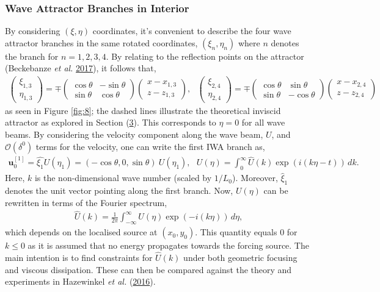 \documentclass[a4paper]{article}
\numberwithin{equation}{section}
\begin{document}
\subsubsection{Wave Attractor Branches in Interior}
\label{sec:4.3.1}
By considering $(\xi, \eta)$ coordinates, it's convenient to describe the four wave attractor branches in the same rotated coordinates, $(\xi_n, \eta_n)$ where $n$ denotes the branch for $n = 1,2,3,4$. By relating to the reflection points on the attractor (Beckebanze \emph{et al.} \hyperlink{ref 8}{2017}), it follows that, 
\begin{align*}
\begin{pmatrix}
\xi_{1,3}\\
\eta_{1,3}
\end{pmatrix} = \mp
\begin{pmatrix}
\cos\theta & -\sin\theta\\
\sin\theta & \cos\theta
\end{pmatrix}
\begin{pmatrix}
x - x_{1,3}\\
z - z_{1,3}
\end{pmatrix}, ~~~
\begin{pmatrix}
\xi_{2,4}\\
\eta_{2,4}
\end{pmatrix} = \mp
\begin{pmatrix}
\cos\theta & \sin\theta\\
\sin\theta & -\cos\theta
\end{pmatrix}
\begin{pmatrix}
x - x_{2,4}\\
z - z_{2,4}
\end{pmatrix}
\end{align*}
as seen in Figure \ref{fig:8}; the dashed lines illustrate the theoretical inviscid attractor as explored in Section (\hyperref[sec:3]{3}). This corresponds to $\eta = 0$ for all wave beams. By considering the velocity component along the wave beam, $U$, and $\mathcal{O}(\delta^0)$ terms for the velocity, one can write the first IWA branch as,
\begin{align}\label{eq:4.8}
\mathbf{u}_0^{[1]} = \hat{\xi_1}U(\eta_1) = (-\cos\theta, 0, \sin\theta)~U(\eta_1), ~~~
U(\eta) = \int_{0}^{\infty} \hat{U}(k) \exp (i(k\eta - t)) \,dk.
\end{align}
Here, $k$ is the non-dimensional wave number (scaled by $1/L_0$). Moreover, $\hat{\xi}_1$ denotes the unit vector pointing along the first branch. Now, $U(\eta)$ can be rewritten in terms of the Fourier spectrum,
\begin{align*}
\hat{U}(k) = \frac{1}{2\pi}\int_{-\infty}^{\infty} U(\eta) \exp (-i(k\eta) )\,d\eta,
\end{align*}
which depends on the localised source at $(x_0, y_0)$. This quantity equals 0 for $k \leq 0$ as it is assumed that no energy propagates towards the forcing source. The main intention is to find constraints for $\hat{U}(k)$ under both geometric focusing and viscous dissipation. These can then be compared against the theory and experiments in Hazewinkel \emph{et al.} (\hyperlink{ref 26}{2016}).
\end{document}
